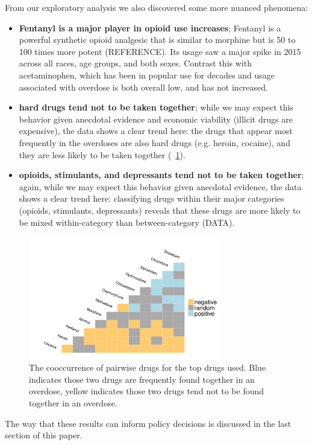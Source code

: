 \documentclass{article}
\begin{document}
From our exploratory analysis we also discovered some more nuanced phenomena:
\begin{itemize}
\item {\bf Fentanyl is a major player in opioid use increases}; Fentanyl is a powerful synthetic opioid analgesic that is similar to morphine but is 50 to 100 times more potent (REFERENCE). Its usage saw a major spike in 2015 across all races, age groups, and both sexes. Contrast this with acetaminophen, which has been in popular use for decades and usage associated with overdose is both overall low, and has not increased.
\item {\bf hard drugs tend not to be taken together}; while we may expect this behavior given anecdotal evidence and economic viability (illicit drugs are expensive), the data shows a clear trend here: the drugs that appear most frequently in the overdoses are also hard drugs (e.g. heroin, cocaine), and they are less likely to be taken together (~\ref{fig:corr}).
\item {\bf opioids, stimulants, and depressants tend not to be taken together}; again, while we may expect this behavior given anecdotal evidence, the data shows a clear trend here: classifying drugs within their major categories (opioids, stimulants, depressants) reveals that these drugs are more likely to be mixed within-category than between-category (DATA).
\end{itemize}

\begin{figure}[h]
\centering
\includegraphics[width=0.75\textwidth]{corr.png}
\caption{The cooccurrence of pairwise drugs for the top drugs used. Blue indicates those two drugs are frequently found together in an overdose, yellow indicates those two drugs tend not to be found together in an overdose.}
\label{fig:corr}
\end{figure}

The way that these results can inform policy decisions is discussed in the last section of this paper.
\end{document}
